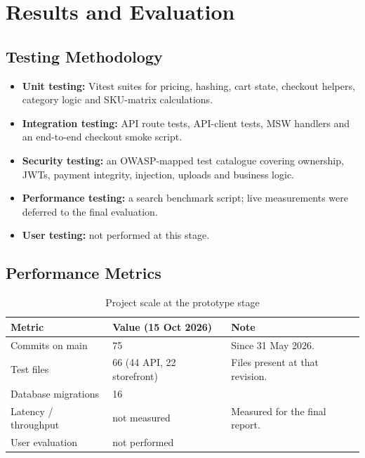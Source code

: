\documentclass{tietreport}
\begin{document}
\chapter{Results and Evaluation}

\section{Testing Methodology}

\begin{itemize}
  \item \textbf{Unit testing:} Vitest suites for pricing, hashing, cart state,
        checkout helpers, category logic and SKU-matrix calculations.
  \item \textbf{Integration testing:} API route tests, API-client tests, MSW
        handlers and an end-to-end checkout smoke script.
  \item \textbf{Security testing:} an OWASP-mapped test catalogue covering
        ownership, JWTs, payment integrity, injection, uploads and business
        logic.
  \item \textbf{Performance testing:} a search benchmark script; live
        measurements were deferred to the final evaluation.
  \item \textbf{User testing:} not performed at this stage.
\end{itemize}

\section{Performance Metrics}

\begin{table}[H]
\centering\small
\begin{tabularx}{\linewidth}{l l X}
\toprule
\textbf{Metric} & \textbf{Value (15 Oct 2026)} & \textbf{Note} \\
\midrule
Commits on main & 75 & Since 31 May 2026. \\
Test files & 66 (44 API, 22 storefront) & Files present at that revision. \\
Database migrations & 16 & \\
Latency / throughput & not measured & Measured for the final report. \\
User evaluation & not performed & \\
\bottomrule
\end{tabularx}
\caption{Project scale at the prototype stage}
\end{table}
\end{document}
